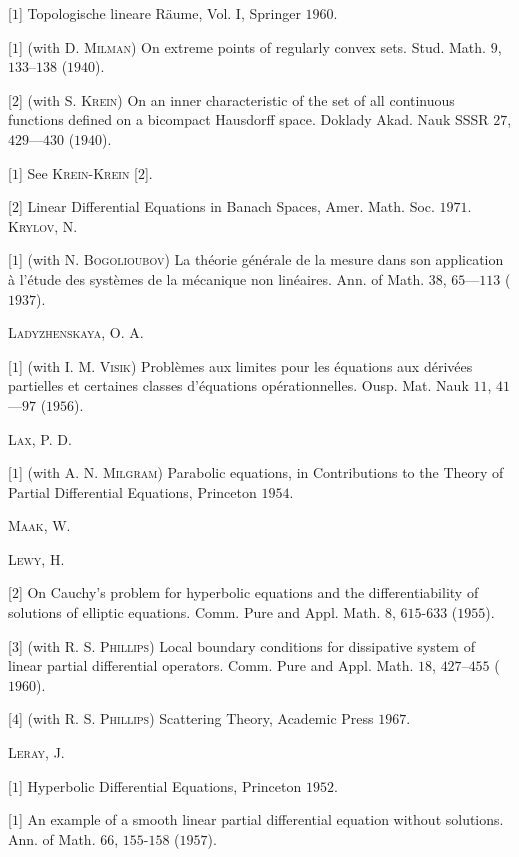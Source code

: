 [$1$] Topologische lineare Räume, Vol. I, Springer $1960$. 


[$1$] (with D. \textsc{Milman}) On extreme points of regularly convex sets. Stud. Math. $9$, $133$--$138$ ($1940$). 

[$2$] (with S. \textsc{Krein}) On an inner characteristic of the set of all continuous functions defined on a bicompact Hausdorff space. Doklady Akad. Nauk SSSR $27$, $429$---$430$ ($1940$). 


[$1$] See \textsc{Krein}-\textsc{Krein} [$2$]. 

[$2$] Linear Differential Equations in Banach Spaces, Amer. Math. Soc. $1971$. \textsc{Krylov}, N. 

[$1$] (with N. \textsc{Bogolioubov}) La théorie générale de la mesure dans son application à l'étude des systèmes de la mécanique non linéaires. Ann. of Math. $38$, $65$---$113$ ($1937$). 

\textsc{Ladyzhenskaya}, O. A. 

[$1$] (with I. M. \textsc{Visik}) Problèmes aux limites pour les équations aux dérivées partielles et certaines classes d'équations opérationnelles. Ousp. Mat. Nauk $11$, $41$---$97$ ($1956$). 

\textsc{Lax}, P. D. 

[$1$] (with A. N. \textsc{Milgram}) Parabolic equations, in Contributions to the Theory of Partial Differential Equations, Princeton $1954$. 

\textsc{Maak}, W. 

\textsc{Lewy}, H. 

[$2$] On Cauchy's problem for hyperbolic equations and the differentiability of solutions of elliptic equations. Comm. Pure and Appl. Math. $8$, $615$-$633$ ($1955$). 

[$3$] (with R. S. \textsc{Phillips}) Local boundary conditions for dissipative system of linear partial differential operators. Comm. Pure and Appl. Math. $18$, $427$--$455$ ($1960$). 

[$4$] (with R. S. \textsc{Phillips}) Scattering Theory, Academic Press $1967$. 

\textsc{Leray}, J. 

[$1$] Hyperbolic Differential Equations, Princeton $1952$. 

[$1$] An example of a smooth linear partial differential equation without solutions. Ann. of Math. $66$, $155$-$158$ ($1957$). 


